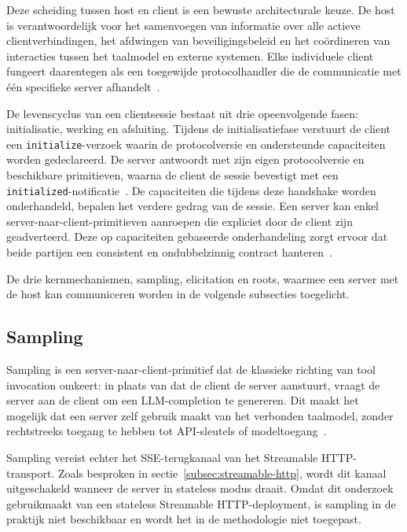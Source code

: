 Deze scheiding tussen host en client is een bewuste architecturale keuze. De host is verantwoordelijk voor het samenvoegen van informatie over alle actieve clientverbindingen, het afdwingen van beveiligingsbeleid en het coördineren van interacties tussen het taalmodel en externe systemen. Elke individuele client fungeert daarentegen als een toegewijde protocolhandler die de communicatie met één specifieke server afhandelt~\cite{Ray_2025}.

De levenscyclus van een clientsessie bestaat uit drie opeenvolgende fasen: initialisatie, werking en afsluiting. Tijdens de initialisatiefase verstuurt de client een \texttt{initialize}-verzoek waarin de protocolversie en ondersteunde capaciteiten worden gedeclareerd. De server antwoordt met zijn eigen protocolversie en beschikbare primitieven, waarna de client de sessie bevestigt met een \texttt{initialized}-notificatie~\cite{mcpspec2025}. De capaciteiten die tijdens deze handshake worden onderhandeld, bepalen het verdere gedrag van de sessie. Een server kan enkel server-naar-client-primitieven aanroepen die expliciet door de client zijn geadverteerd. Deze op capaciteiten gebaseerde onderhandeling zorgt ervoor dat beide partijen een consistent en ondubbelzinnig contract hanteren~\cite{Sekar2026MCP}.

De drie kernmechanismen, sampling, elicitation en roots, waarmee een server met de host kan communiceren worden in de volgende subsecties toegelicht.

\subsection{Sampling}\label{subsec:mcp-sampling}

Sampling is een server-naar-client-primitief dat de klassieke richting van tool invocation omkeert: in plaats van dat de client de server aanstuurt, vraagt de server aan de client om een LLM-completion te genereren. Dit maakt het mogelijk dat een server zelf gebruik maakt van het verbonden taalmodel, zonder rechtstreeks toegang te hebben tot API-sleutels of modeltoegang~\cite{mcpspec2025sampling}.

Sampling vereist echter het SSE-terugkanaal van het Streamable HTTP-transport. Zoals besproken in sectie~\ref{subsec:streamable-http}, wordt dit kanaal uitgeschakeld wanneer de server in stateless modus draait. Omdat dit onderzoek gebruikmaakt van een stateless Streamable HTTP-deployment, is sampling in de praktijk niet beschikbaar en wordt het in de methodologie niet toegepast.

